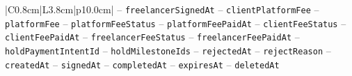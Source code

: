 \begin{center}
\begin{longtable}{|C{0.8cm}|L{3.8cm}|p{10.0cm}|}
\hspace*{1em}-- \texttt{freelancer\allowbreak Signed\allowbreak At} \newline
\hspace*{1em}-- \texttt{client\allowbreak Platform\allowbreak Fee} \newline
\hspace*{1em}-- \texttt{platform\allowbreak Fee} \newline
\hspace*{1em}-- \texttt{platform\allowbreak Fee\allowbreak Status} \newline
\hspace*{1em}-- \texttt{platform\allowbreak Fee\allowbreak Paid\allowbreak At} \newline
\hspace*{1em}-- \texttt{client\allowbreak Fee\allowbreak Status} \newline
\hspace*{1em}-- \texttt{client\allowbreak Fee\allowbreak Paid\allowbreak At} \newline
\hspace*{1em}-- \texttt{freelancer\allowbreak Fee\allowbreak Status} \newline
\hspace*{1em}-- \texttt{freelancer\allowbreak Fee\allowbreak Paid\allowbreak At} \newline
\hspace*{1em}-- \texttt{hold\allowbreak Payment\allowbreak Intent\allowbreak Id} \newline
\hspace*{1em}-- \texttt{hold\allowbreak Milestone\allowbreak Ids} \newline
\hspace*{1em}-- \texttt{rejected\allowbreak At} \newline
\hspace*{1em}-- \texttt{reject\allowbreak Reason} \newline
\hspace*{1em}-- \texttt{created\allowbreak At} \newline
\hspace*{1em}-- \texttt{signed\allowbreak At} \newline
\hspace*{1em}-- \texttt{completed\allowbreak At} \newline
\hspace*{1em}-- \texttt{expires\allowbreak At} \newline
\hspace*{1em}-- \texttt{deleted\allowbreak At} \\

\end{longtable}
\end{center}
